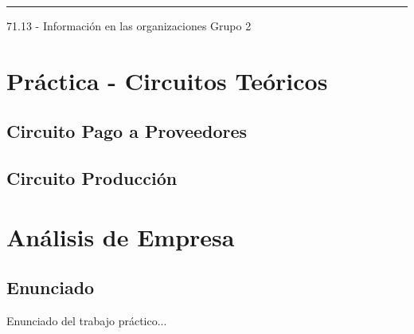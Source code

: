 \documentclass[12pt,titlepage]{report}
\begin{document}
\begin{titlepage}
\vfill

\hrule
\vspace{0.2cm}

\noindent\small{71.13 - Información en las organizaciones \hfill Grupo 2}

\end{titlepage}



\setcounter{page}{1}

\tableofcontents
\newpage




\part{Práctica - Circuitos Te\'oricos}

\chapter{Circuito Pago a Proveedores}


\chapter{Circuito Producci\'on}


\part{Análisis de Empresa}
\chapter*{Enunciado}
Enunciado del trabajo práctico...
\end{document}
